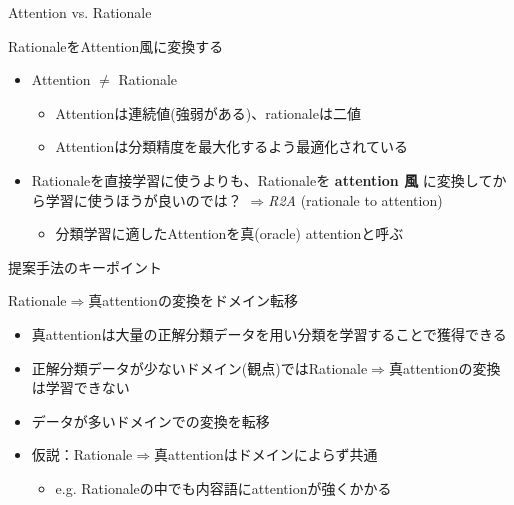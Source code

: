 \begin{frame}{Attention vs. Rationale}
\begin{lead}
    RationaleをAttention風に変換する
\end{lead}
\begin{itemize}
\item Attention $\neq$ Rationale
\begin{itemize}
    \item Attentionは連続値(強弱がある)、rationaleは二値
    \item Attentionは分類精度を最大化するよう最適化されている
\end{itemize}
\item Rationaleを直接学習に使うよりも、Rationaleを \textbf{attention 風} に変換してから学習に使うほうが良いのでは？ $\Rightarrow$\emph{R2A} (rationale to attention)
\begin{itemize}
    \item 分類学習に適したAttentionを\alert{真(oracle) attention}と呼ぶ
\end{itemize}
\end{itemize}
\end{frame}

\begin{frame}{提案手法のキーポイント}
\begin{lead}
    Rationale$\Rightarrow$真attentionの変換をドメイン転移
\end{lead}
\begin{itemize}
\item 真attentionは大量の正解分類データを用い分類を学習することで獲得できる
\item 正解分類データが少ないドメイン(観点)ではRationale$\Rightarrow$真attentionの変換は学習できない
\item データが多いドメインでの変換を転移
\item 仮説：Rationale$\Rightarrow$真attentionは\alert{ドメインによらず共通}
\begin{itemize}
    \item e.g. Rationaleの中でも内容語にattentionが強くかかる
\end{itemize}
\end{itemize}
\end{frame}

